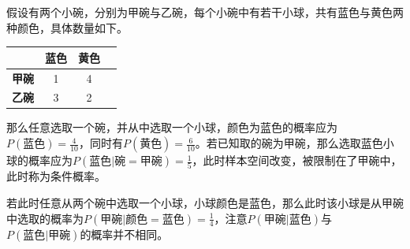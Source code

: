 \documentclass[11pt]{article}
\begin{document}
\begin{example}
    假设有两个小碗，分别为甲碗与乙碗，每个小碗中有若干小球，共有蓝色与黄色两种颜色，具体数量如下。
    \begin{table}[ht!]
    \centering
    \begin{tabular}{cccc}\toprule
    & \textbf{蓝色} & \textbf{黄色} \\ \midrule
    \textbf{甲碗} & 1 & 4  \\
    \textbf{乙碗} & 3 & 2  \\ \bottomrule
    \end{tabular}
    \end{table}

    那么任意选取一个碗，并从中选取一个小球，颜色为蓝色的概率应为$P(\text{蓝色})=\frac{4}{10}$，同时有$P(\text{黄色})=\frac{6}{10}$。若已知取的碗为甲碗，那么选取蓝色小球的概率应为$P(\text{蓝色}|\text{碗}=\text{甲碗})=\frac{1}{5}$，此时样本空间改变，被限制在了甲碗中，此时称为条件概率。

    若此时任意从两个碗中选取一个小球，小球颜色是蓝色，那么此时该小球是从甲碗中选取的概率为$P(\text{甲碗}|\text{颜色}=\text{蓝色})=\frac{1}{4}$，注意$P(\text{甲碗}|\text{蓝色})$与$P(\text{蓝色}|\text{甲碗})$的概率并不相同。
\end{example}
\end{document}
